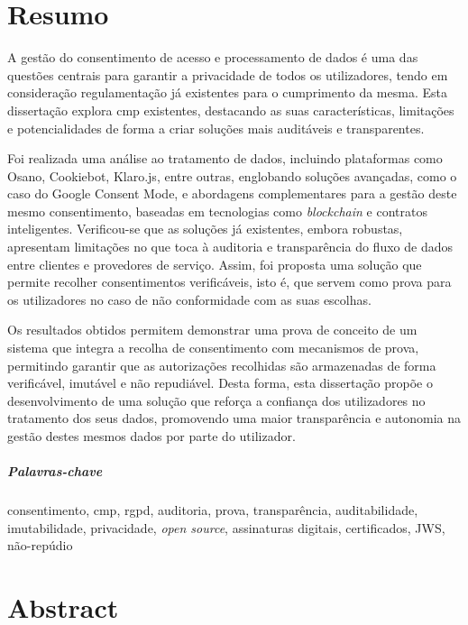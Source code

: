 \chapter*{Resumo}


A gestão do consentimento de acesso e processamento de dados é uma das questões centrais para garantir a privacidade de todos os utilizadores, tendo em consideração regulamentação já existentes para o cumprimento da mesma. Esta dissertação explora \acrfull{cmp} existentes, destacando as suas características, limitações e potencialidades de forma a criar soluções mais auditáveis e transparentes. 

Foi realizada uma análise ao tratamento de dados, incluindo plataformas como Osano, Cookiebot, Klaro.js, entre outras, englobando soluções avançadas, como o caso do Google Consent Mode, e abordagens complementares para a gestão deste mesmo consentimento, baseadas em tecnologias como \textit{blockchain} e contratos inteligentes.
Verificou-se que as soluções já existentes, embora robustas, apresentam limitações no que toca à auditoria e transparência do fluxo de dados entre clientes e provedores de serviço. 
Assim, foi proposta uma solução que permite recolher consentimentos verificáveis, isto é, que servem como prova para os utilizadores no caso de não conformidade com as suas escolhas. 

Os resultados obtidos permitem demonstrar uma prova de conceito de um sistema que integra a recolha de consentimento com mecanismos de prova, permitindo garantir que as autorizações recolhidas são armazenadas de forma verificável, imutável e não repudiável. 
Desta forma, esta dissertação propõe o desenvolvimento de uma solução que reforça a confiança dos utilizadores no tratamento dos seus dados, promovendo uma maior transparência e autonomia na gestão destes mesmos dados por parte do utilizador.

\paragraph{Palavras-chave} consentimento, \acrshort{cmp}, \acrshort{rgpd}, auditoria, prova, transparência, auditabilidade, imutabilidade, privacidade, \textit{open source}, assinaturas digitais, certificados, JWS, não-repúdio


\cleardoublepage

\chapter*{Abstract}

